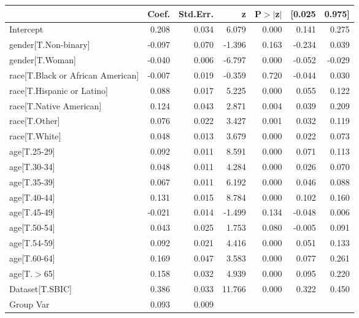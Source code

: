 \begin{table}
\begin{center}
\begin{tabular}{lrrrrrr}
\hline
                                  &  Coef. & Std.Err. &      z & P$> |$z$|$ & [0.025 & 0.975]  \\
\hline
Intercept                         &  0.208 &    0.034 &  6.079 &       0.000 &  0.141 &  0.275  \\
gender[T.Non-binary]              & -0.097 &    0.070 & -1.396 &       0.163 & -0.234 &  0.039  \\
gender[T.Woman]                   & -0.040 &    0.006 & -6.797 &       0.000 & -0.052 & -0.029  \\
race[T.Black or African American] & -0.007 &    0.019 & -0.359 &       0.720 & -0.044 &  0.030  \\
race[T.Hispanic or Latino]        &  0.088 &    0.017 &  5.225 &       0.000 &  0.055 &  0.122  \\
race[T.Native American]           &  0.124 &    0.043 &  2.871 &       0.004 &  0.039 &  0.209  \\
race[T.Other]                     &  0.076 &    0.022 &  3.427 &       0.001 &  0.032 &  0.119  \\
race[T.White]                     &  0.048 &    0.013 &  3.679 &       0.000 &  0.022 &  0.073  \\
age[T.25-29]                      &  0.092 &    0.011 &  8.591 &       0.000 &  0.071 &  0.113  \\
age[T.30-34]                      &  0.048 &    0.011 &  4.284 &       0.000 &  0.026 &  0.070  \\
age[T.35-39]                      &  0.067 &    0.011 &  6.192 &       0.000 &  0.046 &  0.088  \\
age[T.40-44]                      &  0.131 &    0.015 &  8.784 &       0.000 &  0.102 &  0.160  \\
age[T.45-49]                      & -0.021 &    0.014 & -1.499 &       0.134 & -0.048 &  0.006  \\
age[T.50-54]                      &  0.043 &    0.025 &  1.753 &       0.080 & -0.005 &  0.091  \\
age[T.54-59]                      &  0.092 &    0.021 &  4.416 &       0.000 &  0.051 &  0.133  \\
age[T.60-64]                      &  0.169 &    0.047 &  3.583 &       0.000 &  0.077 &  0.261  \\
age[T.$>$65]                      &  0.158 &    0.032 &  4.939 &       0.000 &  0.095 &  0.220  \\
Dataset[T.SBIC]                   &  0.386 &    0.033 & 11.766 &       0.000 &  0.322 &  0.450  \\
Group Var                         &  0.093 &    0.009 &        &             &        &         \\
\hline
\end{tabular}
\end{center}
\end{table}
\bigskip